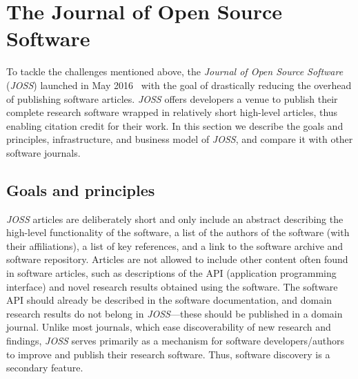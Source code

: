 \documentclass{article}
\newcommand\joss{\textit{JOSS}}
\begin{document}
\section{The Journal of Open Source Software}

To tackle the challenges mentioned above, the \textit{Journal of Open Source Software} (\joss{}) launched in May 2016~\cite{arfondotorg} with the goal of drastically reducing the overhead of publishing software articles.
\joss{} offers developers a venue to publish their complete research software wrapped in relatively short high-level articles, thus enabling citation credit for their work.
In this section we describe the goals and principles, infrastructure, and business model of \joss{}, and compare it with other software journals.

\subsection{Goals and principles}

\joss{} articles are deliberately short and only include an abstract describing the high-level functionality of the software, a list of the authors of the software (with their affiliations), a list of key references, and a link to the software archive and software repository. Articles are not allowed to include other content often found in software articles, such as descriptions of the API (application programming interface) and novel research results obtained using the software.
The software API should already be described in the software documentation, and domain research results do not belong in \joss{}---these should be published in a domain journal.
Unlike most journals, which ease discoverability of new research and findings, \joss{} serves primarily as a mechanism for software developers\slash authors to improve and publish their research software.
Thus, software discovery is a secondary feature.
\end{document}

